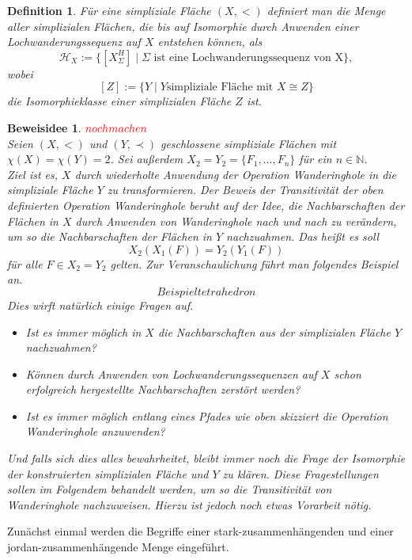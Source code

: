 \documentclass[12pt,titlepage]{article}
\newtheorem{definition}{Definition}[section]
\newtheorem{beweisidee}{Beweisidee}[section]
\begin{document}
\begin{definition}
Für eine simpliziale Fläche $(X,<)$ definiert man die Menge aller simplizialen Flächen, die bis auf Isomorphie durch Anwenden einer Lochwanderungssequenz auf $X$ entstehen können, als
\[
\mathcal{H}_X:=\{[X_{\Sigma}^H] \mid \Sigma \text{ ist eine Lochwanderungssequenz von X}\},
\]
wobei
\[
 [Z] := \{Y \mid Y \text{simpliziale Fläche mit } X \cong Z\}
\] die \emph{Isomorphieklasse} einer simplizialen Fläche  $Z$ ist. 

\end{definition}
\begin{beweisidee}
$\textcolor{red}{nochmachen}$\\
Seien $(X,<)$ und $(Y,\prec)$ geschlossene simpliziale Flächen mit $\chi(X)=\chi(Y)=2$. Sei außerdem $X_2=Y_2=\{F_1,\ldots, F_n\}$ für ein $n \in \mathbb{N}$.\\
Ziel ist es, $X$ durch wiederholte Anwendung der Operation Wanderinghole in die simpliziale Fläche $Y$ zu transformieren.
Der Beweis der Transitivität der oben definierten Operation Wanderinghole beruht auf der Idee, die Nachbarschaften der Flächen in $X$ durch Anwenden von Wanderinghole nach und nach zu verändern, um so die Nachbarschaften der Flächen in $Y$ nachzuahmen. Das heißt es soll
\[
X_2(X_1(F))=Y_2(Y_1(F)) 
\]
für alle $F\in X_2=Y_2$ gelten. Zur Veranschaulichung führt man folgendes Beispiel an.
\[
Beispiel tetrahedron
\]
Dies wirft natürlich einige Fragen auf.
\begin{itemize}
\item Ist es immer möglich in $X$ die Nachbarschaften aus der simplizialen Fläche $Y$ nachzuahmen?
\item Können durch Anwenden von Lochwanderungssequenzen auf $X$ schon erfolgreich hergestellte Nachbarschaften zerstört werden?
\item Ist es immer möglich entlang eines Pfades wie oben skizziert die Operation Wanderinghole anzuwenden? 
\end{itemize}
Und falls sich dies alles bewahrheitet, bleibt immer noch die Frage der Isomorphie der konstruierten simplizialen Fläche und $Y$ zu klären. Diese Fragestellungen sollen im Folgendem behandelt werden, um so die Transitivität von Wanderinghole nachzuweisen. Hierzu ist jedoch noch etwas Vorarbeit nötig.
\end{beweisidee}
Zunächst einmal werden die Begriffe einer stark-zusammenhängenden und einer jordan-zusammenhängende Menge eingeführt.
\end{document}
